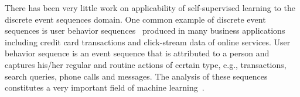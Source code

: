\documentclass{article}
\begin{document}

There has been very little work on applicability of self-supervised learning to the discrete event sequences domain. One common example of discrete event sequences is user behavior sequences~\cite{Ni2018PerceiveYU} produced in many business applications including credit card transactions and click-stream data of online services. User behavior sequence is an event sequence that is attributed to a person and captures his/her regular and routine actions of certain type, e.g., transactions, search queries, phone calls and messages. The analysis of these sequences constitutes a very important field of machine learning~\cite{Laxman2008StreamPU, Wiese2009CreditCT, Zhang2017CreditRA, Bigon2019PredictionIV}.
\end{document}
